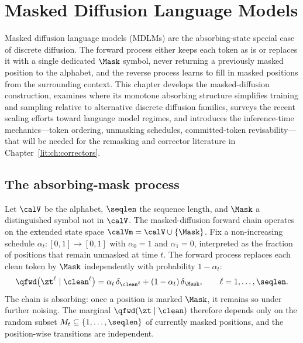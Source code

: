 
\chapter{Masked Diffusion Language Models}
\label{lit:ch:masked-diffusion}

Masked diffusion language models (MDLMs) are the absorbing-state special
case of discrete diffusion. The forward process either keeps each token as
is or replaces it with a single dedicated $\Mask$ symbol, never returning a
previously masked position to the alphabet, and the reverse process learns
to fill in masked positions from the surrounding context. This chapter
develops the masked-diffusion construction, examines where its monotone
absorbing structure simplifies training and sampling relative to alternative
discrete diffusion families, surveys the recent scaling efforts toward
language model regimes, and introduces the inference-time mechanics---token
ordering, unmasking schedules, committed-token revisability---that will be
needed for the remasking and corrector literature in
Chapter~\ref{lit:ch:correctors}.

\section{The absorbing-mask process}
\label{lit:sec:absorbing}

Let $\calV$ be the alphabet, $\seqlen$ the sequence length, and $\Mask$ a
distinguished symbol not in $\calV$. The masked-diffusion forward chain
operates on the extended state space $\calVm = \calV\cup\{\Mask\}$. Fix a
non-increasing schedule $\alpha_t : [0,1]\to[0,1]$ with $\alpha_0 = 1$ and
$\alpha_1 = 0$, interpreted as the fraction of positions that remain
unmasked at time $t$. The forward process replaces each clean token by
$\Mask$ independently with probability $1-\alpha_t$:
\[
  \qfwd\big(\zt^\ell \mid \clean^\ell\big)
  = \alpha_t\,\delta_{\clean^\ell} + (1-\alpha_t)\,\delta_{\Mask},
  \qquad \ell=1,\ldots,\seqlen.
\]
The chain is absorbing: once a position is marked $\Mask$, it remains so
under further noising. The marginal $\qfwd(\zt\mid \clean)$ therefore
depends only on the random subset $M_t \subseteq \{1,\ldots,\seqlen\}$ of
currently masked positions, and the position-wise transitions are
independent.


